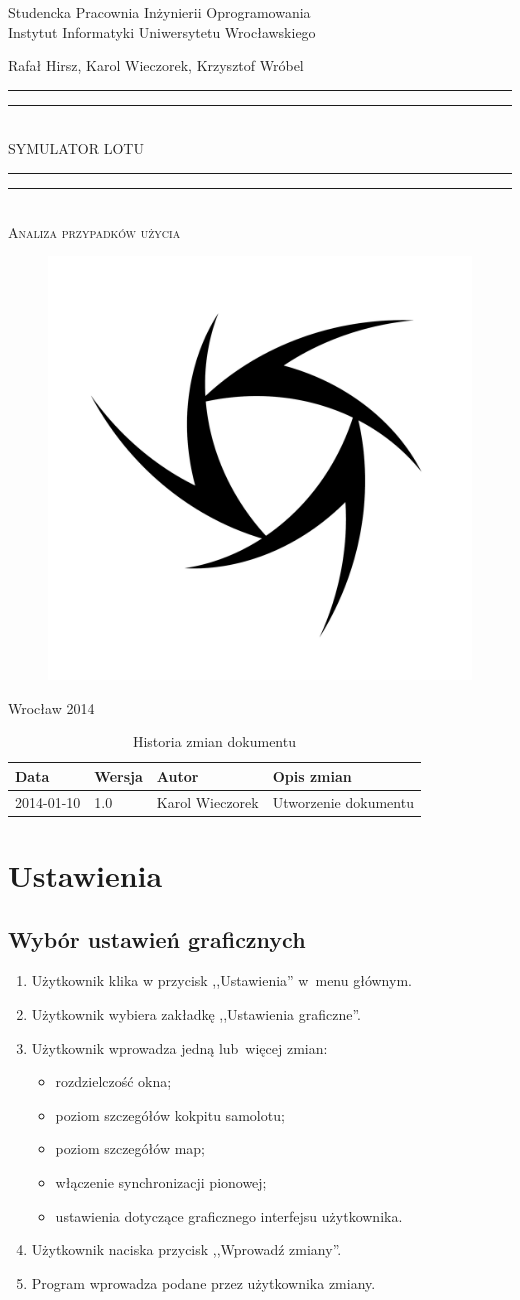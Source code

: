 \documentclass{mwrep}
\newcommand*{\titleGP}{\begingroup
\centering

{\large Studencka Pracownia Inżynierii Oprogramowania}\\Instytut Informatyki Uniwersytetu Wrocławskiego\par
\vspace*{16\baselineskip}

{\Large Rafał Hirsz, Karol Wieczorek, Krzysztof Wróbel\par}
\vspace*{\baselineskip}

\rule{\textwidth}{1.6pt}\vspace*{-\baselineskip}\vspace*{2pt}
\rule{\textwidth}{0.4pt}\\[\baselineskip]

{\Huge SYMULATOR LOTU}\\[0.2\baselineskip]

\rule{\textwidth}{0.4pt}\vspace*{-\baselineskip}\vspace{3.2pt}
\rule{\textwidth}{1.6pt}\\[\baselineskip]

\scshape
{\huge Analiza przypadków użycia}\par
\vspace*{2\baselineskip}

\begin{figure}[h]
\centering
\includegraphics[width=5\baselineskip]{flightsim-team-logo.pdf}
\end{figure}
\vfill

{\large Wrocław 2014}\par

\pagebreak

\endgroup}
\begin{document}
\thispagestyle{empty}
\titleGP

\begin{center}
\begin{table}[h]
\begin{center}
\caption{Historia zmian dokumentu}\label{T:Zmiany}
\vspace{3ex}
\begin{tabularx}{1\textwidth}{|l|l|l|X|}
\hline
Data & Wersja & Autor & Opis zmian \\ \hline
2014-01-10 & 1.0 & Karol Wieczorek & Utworzenie dokumentu \\
\hline
\end{tabularx}
\end{center}
\end{table}
\end{center}

\pagebreak

\tableofcontents

\chapter{Ustawienia}
\section{Wybór ustawień graficznych}
\begin{enumerate}
  \item Użytkownik klika w przycisk ,,Ustawienia'' w~menu głównym.
  \item Użytkownik wybiera zakładkę ,,Ustawienia graficzne''.
  \item Użytkownik wprowadza jedną lub~więcej zmian:
    \begin{itemize}
      \item rozdzielczość okna;
      \item poziom szczegółów kokpitu samolotu;
      \item poziom szczegółów map;
      \item włączenie synchronizacji pionowej;
      \item ustawienia dotyczące graficznego interfejsu użytkownika.
    \end{itemize}
  \item Użytkownik naciska przycisk ,,Wprowadź zmiany''.
  \item Program wprowadza podane przez użytkownika zmiany.
\end{enumerate}
\end{document}
